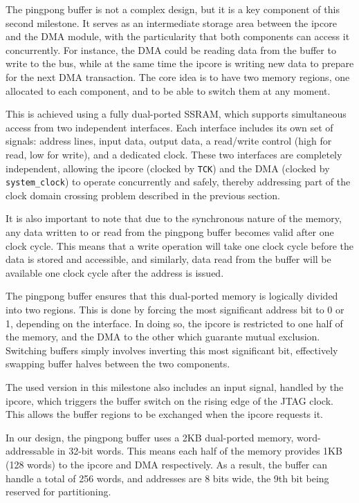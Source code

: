 \documentclass[a4paper,11pt,oneside]{report}
\begin{document}
The pingpong buffer is not a complex design, but it is a key component of this second milestone. 
It serves as an intermediate storage area between the ipcore and the DMA module, 
with the particularity that both components can access it concurrently. 
For instance, the DMA could be reading data from the buffer to write to the bus, 
while at the same time the ipcore is writing new data to prepare for the next DMA transaction. 
The core idea is to have two memory regions, one allocated to each component, and to be able to switch them at any moment. 

This is achieved using a fully dual-ported SSRAM, which supports simultaneous access from two independent interfaces. 
Each interface includes its own set of signals: address lines, input data, output data, a read/write control (high for read, low for write), and a dedicated clock. 
These two interfaces are completely independent, allowing the ipcore (clocked by \texttt{TCK}) 
and the DMA (clocked by \texttt{system\_clock}) to operate concurrently and safely, 
thereby addressing part of the clock domain crossing problem described in the previous section.

It is also important to note that due to the synchronous nature of the memory, 
any data written to or read from the pingpong buffer becomes valid after one clock cycle. 
This means that a write operation will take one clock cycle before the data is stored and accessible, 
and similarly, data read from the buffer will be available one clock cycle after the address is issued. 

The pingpong buffer ensures that this dual-ported memory is logically divided into two regions. 
This is done by forcing the most significant address bit to 0 or 1, depending on the interface. 
In doing so, the ipcore is restricted to one half of the memory, 
and the DMA to the other which guarante mutual exclusion. 
Switching buffers simply involves inverting this most significant bit, effectively swapping buffer halves between the two components.

The used version in this milestone also includes an input signal, handled by the ipcore, 
which triggers the buffer switch on the rising edge of the JTAG clock. 
This allows the buffer regions to be exchanged when the ipcore requests it.

In our design, the pingpong buffer uses a 2KB dual-ported memory, word-addressable in 32-bit words. 
This means each half of the memory provides 1KB (128 words) to the ipcore and DMA respectively. 
As a result, the buffer can handle a total of 256 words, and addresses are 8 bits wide, the 9th bit being reserved for partitioning.
\end{document}
